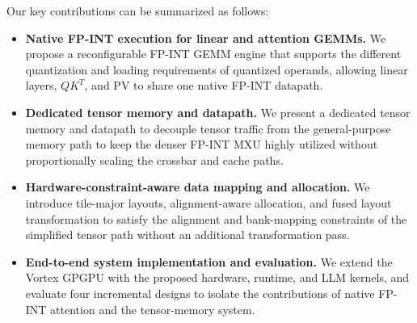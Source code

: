 \documentclass[sigconf,anonymous,nonacm]{acmart}
\newcommand{\ours}{\textsc{FINISH}}
\newcommand{\fpint}{FP-INT}
\begin{document}
Our key contributions can be summarized as follows:
\begin{itemize}[leftmargin=*]
    \item \textbf{Native \fpint{} execution for linear and attention GEMMs.} We propose a reconfigurable \fpint{} GEMM engine that supports the different quantization and loading requirements of quantized operands, allowing linear layers, $QK^T$, and PV to share one native \fpint{} datapath.

    \item \textbf{Dedicated tensor memory and datapath.} We present a dedicated tensor memory and datapath to decouple tensor traffic from the general-purpose memory path to keep the denser \fpint{} MXU highly utilized without proportionally scaling the crossbar and cache paths.

    \item \textbf{Hardware-constraint-aware data mapping and allocation.} We introduce tile-major layouts, alignment-aware allocation, and fused layout transformation to satisfy the alignment and bank-mapping constraints of the simplified tensor path without an additional transformation pass.

    \item \textbf{End-to-end system implementation and evaluation.} We extend the Vortex GPGPU with the proposed hardware, runtime, and LLM kernels, and evaluate four incremental designs to isolate the contributions of native \fpint{} attention and the tensor-memory system. %




\end{itemize}
\end{document}
